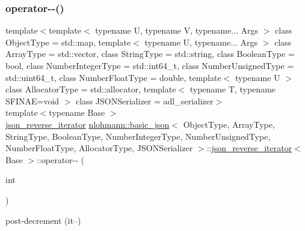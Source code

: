 \subsubsection{\texorpdfstring{operator-\/-\/()}{operator--()}\hspace{0.1cm}{\footnotesize\ttfamily [1/2]}}
{\footnotesize\ttfamily template$<$template$<$ typename U, typename V, typename... Args $>$ class Object\+Type = std\+::map, template$<$ typename U, typename... Args $>$ class Array\+Type = std\+::vector, class String\+Type  = std\+::string, class Boolean\+Type  = bool, class Number\+Integer\+Type  = std\+::int64\+\_\+t, class Number\+Unsigned\+Type  = std\+::uint64\+\_\+t, class Number\+Float\+Type  = double, template$<$ typename U $>$ class Allocator\+Type = std\+::allocator, template$<$ typename T, typename S\+F\+I\+N\+A\+E=void $>$ class J\+S\+O\+N\+Serializer = adl\+\_\+serializer$>$ \\
template$<$typename Base $>$ \\
\mbox{\hyperlink{classnlohmann_1_1basic__json_1_1json__reverse__iterator}{json\+\_\+reverse\+\_\+iterator}} \mbox{\hyperlink{classnlohmann_1_1basic__json}{nlohmann\+::basic\+\_\+json}}$<$ Object\+Type, Array\+Type, String\+Type, Boolean\+Type, Number\+Integer\+Type, Number\+Unsigned\+Type, Number\+Float\+Type, Allocator\+Type, J\+S\+O\+N\+Serializer $>$\+::\mbox{\hyperlink{classnlohmann_1_1basic__json_1_1json__reverse__iterator}{json\+\_\+reverse\+\_\+iterator}}$<$ Base $>$\+::operator-\/-\/ (\begin{DoxyParamCaption}\item[{int}]{ }\end{DoxyParamCaption})\hspace{0.3cm}{\ttfamily [inline]}}



post-\/decrement (it--) 

\mbox{\label{classnlohmann_1_1basic__json_1_1json__reverse__iterator_ae446e535faf6bf4a20d75ffc8525d20d}} 
